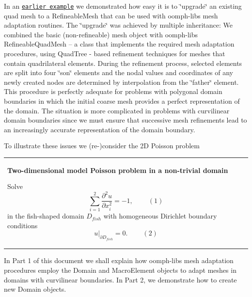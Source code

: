In an \href{../../../../doc/poisson/two_d_poisson_adapt/html/index.html}{\tt earlier example} we demonstrated how easy it is to \char`\"{}upgrade\char`\"{} an existing quad mesh to a {\ttfamily Refineable\+Mesh} that can be used with {\ttfamily oomph-\/lib\textquotesingle{}s} mesh adaptation routines. The \char`\"{}upgrade\char`\"{} was achieved by multiple inheritance\+: We combined the basic (non-\/refineable) mesh object with {\ttfamily oomph-\/lib\textquotesingle{}s} {\ttfamily Refineable\+Quad\+Mesh} -- a class that implements the required mesh adaptation procedures, using {\ttfamily Quad\+Tree} -\/ based refinement techniques for meshes that contain quadrilateral elements. During the refinement process, selected elements are split into four \char`\"{}son\char`\"{} elements and the nodal values and coordinates of any newly created nodes are determined by interpolation from the \char`\"{}father\char`\"{} element. This procedure is perfectly adequate for problems with polygonal domain boundaries in which the initial coarse mesh provides a perfect representation of the domain. The situation is more complicated in problems with curvilinear domain boundaries since we must ensure that successive mesh refinements lead to an increasingly accurate representation of the domain boundary.

To illustrate these issues we (re-\/)consider the 2D Poisson problem \begin{center} \tabulinesep=1mm
\begin{longtabu} spread 0pt [c]{*{1}{|X[-1]}|}
\hline
\begin{center} {\bfseries Two-\/dimensional model Poisson problem in a non-\/trivial domain} \end{center}  Solve \[ \sum_{i=1}^2 \frac{\partial^2u}{\partial x_i^2} = -1, \ \ \ \ \ \ \ \ \ \ (1) \] in the fish-\/shaped domain $D_{fish} $ with homogeneous Dirichlet boundary conditions \[ \left. u\right|_{\partial D_{fish}}=0. \ \ \ \ \ \ \ \ \ \ (2) \]   \\
\end{longtabu}
\end{center} 

In Part 1 of this document we shall explain how {\ttfamily oomph-\/lib\textquotesingle{}s} mesh adaptation procedures employ the {\ttfamily Domain} and {\ttfamily Macro\+Element} objects to adapt meshes in domains with curvilinear boundaries. In Part 2, we demonstrate how to create new {\ttfamily Domain} objects.



